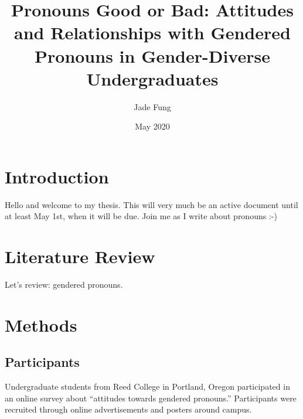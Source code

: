 \documentclass[12pt,twoside]{reedthesis}
\title{Pronouns Good or Bad: Attitudes and Relationships with Gendered Pronouns in Gender-Diverse Undergraduates}
\author{Jade Fung}
\date{May 2020}
\begin{document}
  \maketitle

\frontmatter %
\pagestyle{empty} %



  \hypersetup{linkcolor=black}
  \setcounter{tocdepth}{2}
  \tableofcontents

  \listoftables

  \listoffigures



\mainmatter %
\pagestyle{fancyplain} %

\hypertarget{introduction}{%
\chapter*{Introduction}\label{introduction}}

Hello and welcome to my thesis. This will very much be an active document until at least May 1st, when it will be due. Join me as I write about pronouns :-)

\hypertarget{literature-review}{%
\chapter{Literature Review}\label{literature-review}}

Let's review: gendered pronouns.

\hypertarget{methods}{%
\chapter{Methods}\label{methods}}

\hypertarget{participants}{%
\section{Participants}\label{participants}}

Undergraduate students from Reed College in Portland, Oregon participated in an online survey about ``attitudes towards gendered pronouns.'' Participants were recruited through online advertisements and posters around campus.
\end{document}
